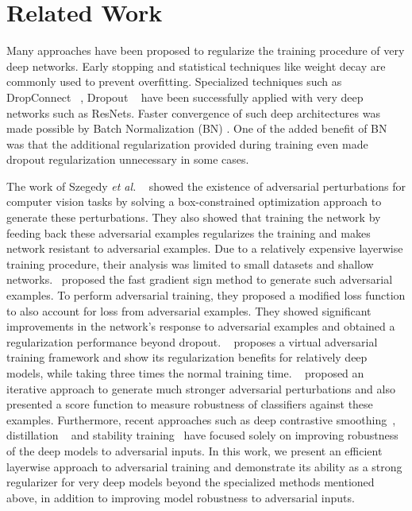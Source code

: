 \section{Related Work}
Many approaches have been proposed to regularize the training procedure of very deep networks. Early stopping and statistical techniques like weight decay are commonly used to prevent overfitting. Specialized techniques such as DropConnect ~\cite{icml2013_wan13}, Dropout ~\cite{srivastava2014dropout} have been successfully applied with very deep networks such as ResNets. Faster convergence of such deep architectures was made possible by Batch Normalization (BN) \cite{ioffe2015batch}. One of the added benefit of BN was that the additional regularization provided during training even made dropout regularization unnecessary in some cases.

The work of Szegedy \emph{et al.} ~\cite{szegedy2013intriguing} showed the existence of adversarial perturbations for computer vision tasks by solving a box-constrained optimization approach to generate these perturbations. They also showed that training the network by feeding back these adversarial examples regularizes the training and makes network resistant to adversarial examples. Due to a relatively expensive layerwise training procedure, their analysis was limited to small datasets and shallow networks.~\cite{goodfellow2014explaining} proposed the fast gradient sign method to generate such adversarial examples. To perform adversarial training, they proposed a modified loss function to also account for loss from adversarial examples. They showed significant improvements in the network's response to adversarial examples and obtained a regularization performance beyond dropout. ~\cite{miyato2017virtual} proposes a virtual adversarial training framework and show its regularization benefits for relatively deep models, while taking three times the normal training time. ~\cite{deepfool} proposed an iterative approach to generate much stronger adversarial perturbations and also presented a score function to measure robustness of classifiers against these examples. Furthermore, recent approaches such as deep contrastive smoothing~\cite{gu2014towards}, distillation  ~\cite{papernot2016distillation} and stability training~\cite{zheng2016improving} have focused solely on improving robustness of the deep models to adversarial inputs. In this work, we present an efficient layerwise approach to adversarial training and demonstrate its ability as a strong regularizer for very deep models beyond the specialized methods mentioned above, in addition to improving model robustness to adversarial inputs.


